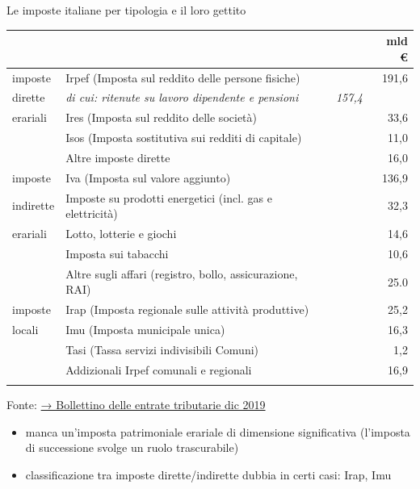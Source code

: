 \documentclass[11pt]{beamer}
\begin{document}
\begin{frame}{Le imposte italiane per tipologia e il loro gettito}
\vspace{-3mm}
\footnotesize
\begin{center}
\begin{tabular}{llrr}
 &  &  & mld €\\[0pt]
\hline
imposte & \alert{Irpef} (Imposta sul reddito delle persone fisiche) &  & 191,6\\[0pt]
dirette & \emph{di cui: ritenute su lavoro dipendente e pensioni} & \emph{157,4} & \\[0pt]
erariali & \alert{Ires} (Imposta sul reddito delle società) &  & 33,6\\[0pt]
 & \alert{Isos} (Imposta sostitutiva sui redditi di capitale) &  & 11,0\\[0pt]
 & Altre imposte dirette &  & 16,0\\[0pt]
\hline
imposte & \alert{Iva} (Imposta sul valore aggiunto) &  & 136,9\\[0pt]
indirette & Imposte su prodotti energetici (incl. gas e elettricità) &  & 32,3\\[0pt]
erariali & Lotto, lotterie e giochi &  & 14,6\\[0pt]
 & Imposta sui tabacchi &  & 10,6\\[0pt]
 & Altre sugli affari (registro, bollo, assicurazione, RAI) &  & 25.0\\[0pt]
\hline
imposte & \alert{Irap} (Imposta regionale sulle attività produttive) &  & 25,2\\[0pt]
locali & \alert{Imu} (Imposta municipale unica) &  & 16,3\\[0pt]
 & \alert{Tasi} (Tassa servizi indivisibili Comuni) &  & 1,2\\[0pt]
 & Addizionali Irpef comunali e regionali &  & 16,9\\[0pt]
 &  &  & \\[0pt]
\end{tabular}
\end{center}
\tiny Fonte: \href{https://www.finanze.gov.it/export/sites/finanze/.galleries/Documenti/entrate\_tributarie\_2019/Bollettino-entrate-Dicembre2019.pdf}{→ Bollettino delle entrate tributarie dic 2019}

\small
\begin{itemize}
\item manca un'imposta patrimoniale erariale di dimensione significativa
(l'imposta di successione svolge un ruolo trascurabile)
\item classificazione tra imposte dirette/indirette dubbia in certi casi: Irap, Imu
\end{itemize}
\end{frame}
\end{document}
